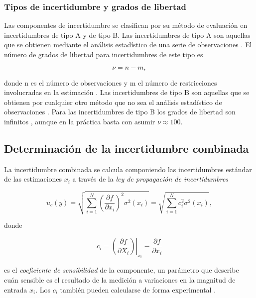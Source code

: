\subsubsection{Tipos de incertidumbre y grados de libertad}

Las componentes de incertidumbre se clasifican por su método de evaluación en incertidumbres de tipo A y de tipo B. Las incertidumbres de tipo A son aquellas que se obtienen mediante el análisis estadístico de una serie de observaciones \cite{GUM4.2}. El número de grados de libertad para incertidumbres de este tipo es 

\begin{equation}
  \nu = n - m,
\end{equation}

donde n es el número de observaciones y m el número de restricciones involucradas en la estimación \cite{GUM4.2,GUMG.3.3}. Las incertidumbres de tipo B son aquellas que se obtienen por cualquier otro método que no sea el análisis estadístico de observaciones \cite{GUM4.3}. Para las incertidumbres de tipo B los grados de libertad son infinitos \cite{GUMG.6.4}, aunque en la práctica basta con asumir $\nu \approx 100$. %

\subsection{Determinación de la incertidumbre combinada}

La incertidumbre combinada se calcula componiendo las incertidumbres estándar de las estimaciones $x_i$ a través de la \textit{ley de propagación de incertidumbres}

\begin{equation}
    u_c(y) = \sqrt{\sum^{N}_{i=1} \left(\dfrac{\partial f}{\partial x_i}\right)^2 \sigma^2(x_i)} = \sqrt{\sum^{N}_{i=1} c_i^2 \sigma^2(x_i)} ,
\end{equation}  

donde

\begin{equation}
    c_i = \left. \left(\frac{\partial f}{\partial X_i}\right) \right|_{x_i} \equiv \frac{\partial f}{\partial x_i}
\end{equation}

es el \textit{coeficiente de sensibilidad} de la componente, un parámetro que describe cuán sensible es el resultado de la medición a variaciones en la magnitud de entrada $x_i$. Los $c_i$ también pueden calcularse de forma experimental \cite{GUM5.1}.

